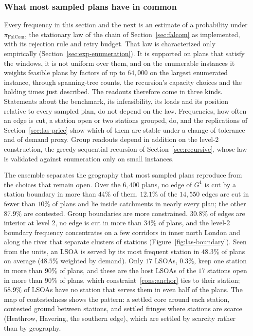 \documentclass[preprint,12pt,authoryear]{elsarticle}
\theoremstyle{definition}
\begin{document}
\subsubsection{What most sampled plans have in common}\label{sec:las-structure}
Every frequency in this section and the next is an estimate of a probability under $\pi_{\mathrm{FalCom}}$, the stationary law of the chain of Section~\ref{sec:falcom} as implemented, with its rejection rule and retry budget. That law is characterized only empirically (Section~\ref{sec:exp-enumeration}). It is supported on plans that satisfy the windows, it is not uniform over them, and on the enumerable instances it weights feasible plans by factors of up to $64{,}000$ on the largest enumerated instance, through spanning-tree counts, the recursion's capacity choices and the holding times just described. The readouts therefore come in three kinds. Statements about the benchmark, its infeasibility, its loads and its position relative to every sampled plan, do not depend on the law. Frequencies, how often an edge is cut, a station open or two stations grouped, do, and the replications of Section~\ref{sec:las-price} show which of them are stable under a change of tolerance and of demand proxy. Group readouts depend in addition on the level-2 construction, the greedy sequential recursion of Section~\ref{sec:recursive}, whose law is validated against enumeration only on small instances.

The ensemble separates the geography that most sampled plans reproduce from the choices that remain open. Over the $6{,}400$ plans, no edge of $G^1$ is cut by a station boundary in more than $44\%$ of them. $12.1\%$ of the $14{,}550$ edges are cut in fewer than $10\%$ of plans and lie inside catchments in nearly every plan; the other $87.9\%$ are contested. Group boundaries are more constrained. $30.8\%$ of edges are interior at level $2$, no edge is cut in more than $34\%$ of plans, and the level-2 boundary frequency concentrates on a few corridors in inner north London and along the river that separate clusters of stations (Figure~\ref{fig:las-boundary}). Seen from the units, an LSOA is served by its most frequent station in $48.3\%$ of plans on average ($48.5\%$ weighted by demand). Only $17$ LSOAs, $0.3\%$, keep one station in more than $90\%$ of plans, and these are the host LSOAs of the $17$ stations open in more than $90\%$ of plans, which constraint~\eqref{cons:anchor} ties to their station; $58.9\%$ of LSOAs have no station that serves them in even half of the plans. The map of contestedness shows the pattern: a settled core around each station, contested ground between stations, and settled fringes where stations are scarce (Heathrow, Havering, the southern edge), which are settled by scarcity rather than by geography.
\end{document}
